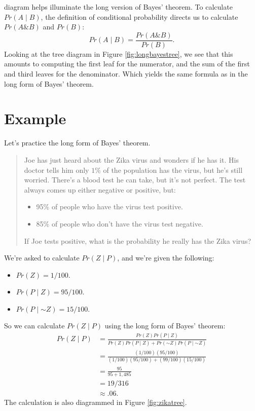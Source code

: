 \documentclass[justified]{tufte-book}
\providecommand{\tightlist}{%
  \setlength{\itemsep}{0pt}\setlength{\parskip}{0pt}}
\newcommand{\given}{\mid}
\renewcommand{\neg}{\mathbin{\sim}}
\renewcommand{\wedge}{\mathbin{\&}}
\newcommand{\p}{Pr}
\newenvironment{problem}{\begin{quote}\normalsize}{\end{quote}}
\theoremstyle{definition}
\theoremstyle{definition}
\theoremstyle{definition}
\theoremstyle{definition}
\theoremstyle{remark}
\begin{document}
 diagram helps illuminate the long version of Bayes' theorem. To calculate \(\p(A \given B)\), the definition of conditional probability directs us to calculate \(\p(A \wedge B)\) and \(\p(B)\):
\[ \p(A \given B) = \frac{ \p(A \wedge B) }{ \p(B) }. \]
Looking at the tree diagram in Figure \ref{fig:longbayestree}, we see that this amounts to computing the first leaf for the numerator, and the sum of the first and third leaves for the denominator. Which yields the same formula as in the long form of Bayes' theorem.

\hypertarget{example-1}{%
\section{Example}\label{example-1}}

Let's practice the long form of Bayes' theorem.

\begin{problem}
Joe has just heard about the Zika virus and wonders if he has it. His
doctor tells him only \(1\%\) of the population has the virus, but he's
still worried. There's a blood test he can take, but it's not perfect.
The test always comes up either negative or positive, but:

\begin{itemize}
\tightlist
\item
  95\% of people who have the virus test positive.
\item
  85\% of people who don't have the virus test negative.
\end{itemize}

If Joe tests positive, what is the probability he really has the Zika
virus?
\end{problem}

We're asked to calculate \(\p(Z \given P)\), and we're given the following:

\begin{itemize}
\tightlist
\item
  \(\p(Z) = 1/100\).
\item
  \(\p(P \given Z) = 95/100\).
\item
  \(\p(P \given \neg Z) = 15/100\).
\end{itemize}

So we can calculate \(\p(Z \given P)\) using the long form of Bayes' theorem:
\[
  \begin{aligned}
    \p(Z \given P) &= \frac{\p(Z)\p(P \given Z)}{\p(Z)\p(P \given Z) + \p(\neg Z)\p(P \given \neg Z)}\\
                   &= \frac{(1/100)(95/100)}{(1/100)(95/100) + (99/100)(15/100)}\\
                   &= \frac{95}{95 + 1,485}\\
                   &= 19/316\\
                   &\approx .06.
  \end{aligned}
\]
The calculation is also diagrammed in Figure \ref{fig:zikatree}.
\end{document}
